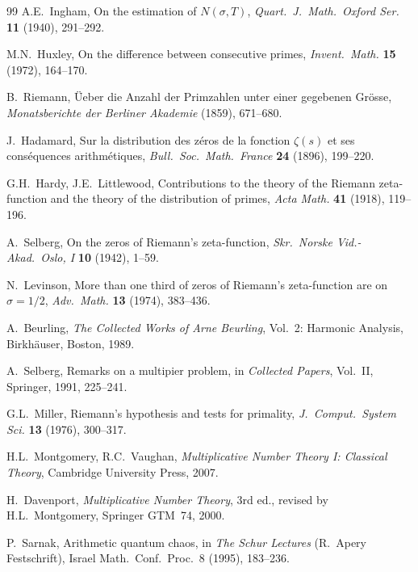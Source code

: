 \documentclass[11pt]{article}
\theoremstyle{remark}
\begin{document}
\begin{thebibliography}{99}
  A.E.~Ingham,
  On the estimation of $N(\sigma, T)$,
  \textit{Quart.\ J.\ Math.\ Oxford Ser.} \textbf{11} (1940), 291--292.

  M.N.~Huxley,
  On the difference between consecutive primes,
  \textit{Invent.\ Math.} \textbf{15} (1972), 164--170.

  B.~Riemann,
  \"Ueber die Anzahl der Primzahlen unter einer gegebenen Gr\"osse,
  \textit{Monatsberichte der Berliner Akademie} (1859), 671--680.

  J.~Hadamard,
  Sur la distribution des z\'eros de la fonction $\zeta(s)$ et ses cons\'equences
  arithm\'etiques,
  \textit{Bull.\ Soc.\ Math.\ France} \textbf{24} (1896), 199--220.

  G.H.~Hardy, J.E.~Littlewood,
  Contributions to the theory of the Riemann zeta-function and the theory of
  the distribution of primes,
  \textit{Acta Math.} \textbf{41} (1918), 119--196.

  A.~Selberg,
  On the zeros of Riemann's zeta-function,
  \textit{Skr.\ Norske Vid.-Akad.\ Oslo, I} \textbf{10} (1942), 1--59.

  N.~Levinson,
  More than one third of zeros of Riemann's zeta-function are on $\sigma=1/2$,
  \textit{Adv.\ Math.} \textbf{13} (1974), 383--436.

  A.~Beurling,
  \textit{The Collected Works of Arne Beurling},
  Vol.~2: Harmonic Analysis,
  Birkh\"auser, Boston, 1989.

  A.~Selberg,
  Remarks on a multipier problem,
  in \textit{Collected Papers}, Vol.~II, Springer, 1991, 225--241.

  G.L.~Miller,
  Riemann's hypothesis and tests for primality,
  \textit{J.\ Comput.\ System Sci.} \textbf{13} (1976), 300--317.

  H.L.~Montgomery, R.C.~Vaughan,
  \textit{Multiplicative Number Theory I: Classical Theory},
  Cambridge University Press, 2007.

  H.~Davenport,
  \textit{Multiplicative Number Theory},
  3rd ed., revised by H.L.~Montgomery, Springer GTM~74, 2000.

  P.~Sarnak,
  Arithmetic quantum chaos,
  in \textit{The Schur Lectures} (R.~Apery Festschrift), Israel Math.\ Conf.\
  Proc.~8 (1995), 183--236.

\end{thebibliography}
\end{document}
